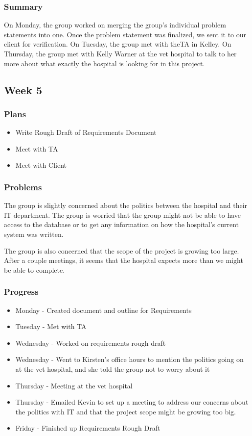 \documentclass[onecolumn, draftclsnofoot,10pt, compsoc]{IEEEtran}
\begin{document}
\subsubsection{Summary}
On Monday, the group worked on merging the group's individual problem statements into one. Once the problem statement was finalized, we sent it to our client for verification. On Tuesday, the group met with theTA in Kelley. On Thursday, the group met with Kelly Warner at the vet hospital to talk to her more about what exactly the hospital is looking for in this project.
\subsection{Week 5}

\subsubsection{Plans}
\begin{itemize}
\item Write Rough Draft of Requirements Document
\item Meet with TA
\item Meet with Client
\end{itemize}


\subsubsection{Problems}
The group is slightly concerned about the politics between the hospital and their IT department. The group is worried that the group might not be able to have access to the database or to get any information on how the hospital's current system was written.

The group is also concerned that the scope of the project is growing too large. After a couple meetings, it seems that the hospital expects more than we might be able to complete. 

\subsubsection{Progress}
\begin{itemize}
\item Monday - Created document and outline for Requirements
\item Tuesday - Met with TA
\item Wednesday - Worked on requirements rough draft
\item Wednesday - Went to Kirsten's office hours to mention the politics going on at the vet hospital, and she told the group not to worry about it
\item Thursday - Meeting at the vet hospital
\item Thursday - Emailed Kevin to set up a meeting to address our concerns about the politics with IT and that the project scope might be growing too big.
\item Friday - Finished up Requirements Rough Draft
\end{itemize}
\end{document}
